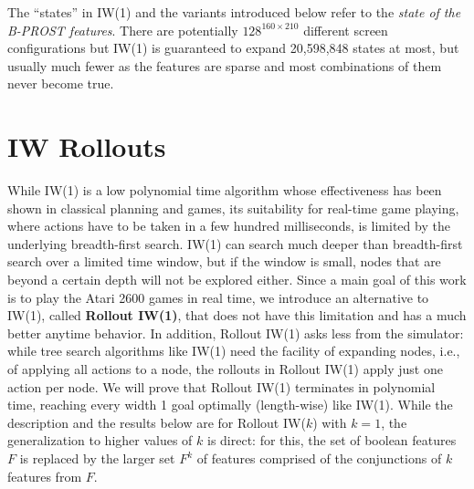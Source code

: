 \documentclass[letterpaper]{article}
\begin{document}
The ``states'' in IW(1) and the variants introduced below refer
to the \emph{state of the B-PROST features}.
There are potentially $128^{160\times210}$ different screen
configurations but IW(1) is guaranteed to expand 20,598,848
states at most, but usually much fewer as the features are
sparse and most combinations of them never become true.




\section{IW Rollouts}

While IW(1) is a low polynomial time algorithm whose effectiveness has been shown in classical planning and games, 
its suitability for real-time game playing, where actions have to be taken in a few hundred milliseconds, 
is limited by  the underlying breadth-first search.  IW(1) can  search much deeper than
breadth-first search over a limited time window,  but if the window is small,
nodes that are beyond a certain depth  will not be explored either.
Since a main  goal of this work is to play the Atari 2600 games in real time,
we introduce an alternative to IW(1), called \textbf{Rollout IW(1)}, that does not have this limitation and has a
much better anytime behavior.
In addition, Rollout IW(1) asks less from the simulator: while tree search algorithms like IW(1) need the facility of
expanding nodes, i.e., of applying all actions to a node, the rollouts in Rollout IW(1) apply
just one action per node.  We will prove  that Rollout IW(1) terminates
in polynomial time, reaching every  width 1 goal  optimally (length-wise) like IW(1).
While the description and the results below are for Rollout IW($k$) with $k=1$, 
the generalization to higher values of $k$ is direct: for this, the set of boolean features $F$ is 
replaced by the larger set $F^k$ of features comprised of  the  conjunctions  of $k$ features from $F$.
\end{document}
